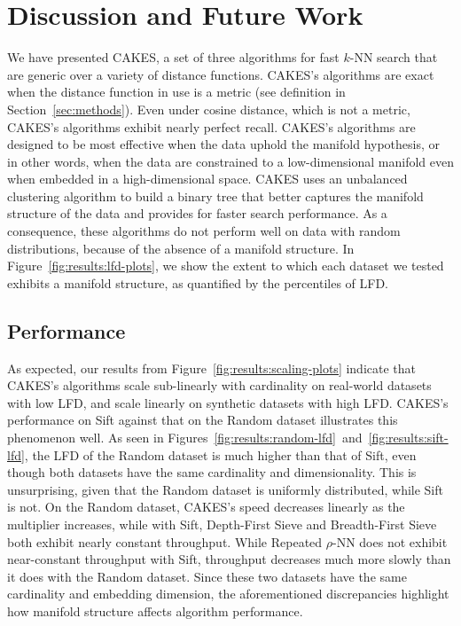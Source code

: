 \section{Discussion and Future Work}
\label{sec:discussion-and-future-work}

We have presented CAKES, a set of three algorithms for fast $k$-NN search that are generic over a variety of distance functions.
CAKES's algorithms are exact when the distance function in use is a metric (see definition in Section~\ref{sec:methods}).
Even under cosine distance, which is not a metric, CAKES's algorithms exhibit nearly perfect recall.
CAKES's algorithms are designed to be most effective when the data uphold the manifold hypothesis, or in other words, when the data are constrained to a low-dimensional manifold even when embedded in a high-dimensional space.
CAKES uses an unbalanced clustering algorithm to build a binary tree that better captures the manifold structure of the data and provides for faster search performance.
As a consequence, these algorithms do not perform well on data with random distributions, because of the absence of a manifold structure.
In Figure~\ref{fig:results:lfd-plots}, we show the extent to which each dataset we tested exhibits a manifold structure, as quantified by the percentiles of LFD.

\subsection{Performance}

As expected, our results from Figure~\ref{fig:results:scaling-plots} indicate that CAKES's algorithms scale sub-linearly with cardinality on real-world datasets with low LFD, and scale linearly on synthetic datasets with high LFD.
CAKES's performance on Sift against that on the Random dataset illustrates this phenomenon well.
As seen in Figures~\ref{fig:results:random-lfd}~and~\ref{fig:results:sift-lfd}, the LFD of the Random dataset is much higher than that of Sift, even though both datasets have the same cardinality and dimensionality.
This is unsurprising, given that the Random dataset is uniformly distributed, while Sift is not.
On the Random dataset, CAKES's speed decreases linearly as the multiplier increases, while with Sift, Depth-First Sieve and Breadth-First Sieve both exhibit nearly constant throughput.
While Repeated $\rho$-NN does not exhibit near-constant throughput with Sift, throughput decreases much more slowly than it does with the Random dataset.
Since these two datasets have the same cardinality and embedding dimension, the aforementioned discrepancies highlight how manifold structure affects algorithm performance.

